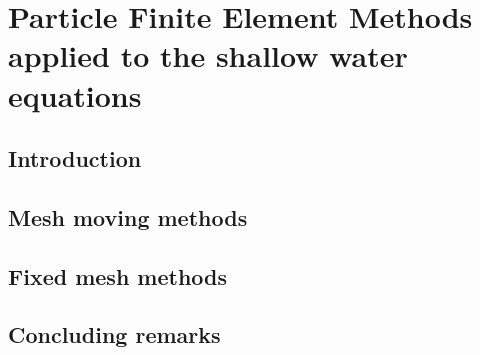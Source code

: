 
\chapter{Particle Finite Element Methods applied to the shallow water equations}
\label{lagrangian_sw}



\section{Introduction}



\section{Mesh moving methods}



\section{Fixed mesh methods}



\section{Concluding remarks}


